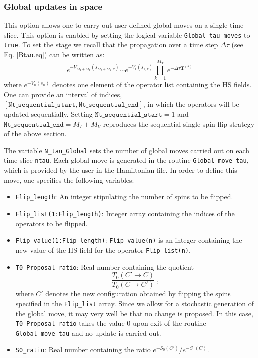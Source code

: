  
% 

\subsubsection{Global updates in space}
\label{sec:global_space}
This option allows one to carry out  user-defined global moves on a single time slice.  This option is enabled by setting the logical variable  \texttt{Global\_tau\_moves} to \texttt{true}.  To set the stage  we recall that the propagation over a time step $\Delta \tau$   (see Eq. \ref{Btau.eq}) can be  written as: 
\begin{equation}
	e^{-V_{M_I+M_V}(s_{M_I+M_V,\tau})}  \cdots e^{-V_{1}(s_{1,\tau})}  \prod_{k=1}^{M_T}   e^{-\Delta \tau {\bm T}^{(k)}}  
\end{equation}
where $e^{-V_{n}(s_{n})}$ denotes one element of the  operator list  containing the HS fields.  One can provide  an interval of indices, 
$ \left[ \texttt{Nt\_sequential\_start}, 
\texttt{Nt\_sequential\_end} \right] $,  in which the operators will be updated  sequentially. Setting $ \texttt{Nt\_sequential\_start} =1 $ and 
$ \texttt{Nt\_sequential\_end} = M_I+M_V$  reproduces the  sequential single spin flip strategy of the above section.

The variable \texttt{N\_tau\_Global}  sets the number of global moves carried out on each time slice \texttt{ntau}. Each global move is generated in the routine  \texttt{Global\_move\_tau}, which is provided by the user in the Hamiltonian file. In order to  define this move, one specifies the following variables: 
\begin{itemize}
\item \texttt{Flip\_length}:  An integer stipulating the  number of spins to be flipped.
\item \texttt{Flip\_list(1:Flip\_length)}:   Integer array containing the  indices of the operators to be flipped.
\item \texttt{Flip\_value(1:Flip\_length)}:  \texttt{Flip\_value(n)} is an  integer containing the new value of the  HS  field for the operator \texttt{Flip\_list(n)}.
\item  \texttt{T0\_Proposal\_ratio}:   Real number containing  the quotient
\begin{equation}
	 \frac{T_0(C' \rightarrow C)}{T_0(C \rightarrow C') }  \;,
\end{equation}
where $ C'$  denotes the new configuration  obtained by flipping the spins specified in the \texttt{Flip\_list}  array. 
Since we allow for a stochastic  generation of  the global move, it may very well be that no change is proposed. In this case, \texttt{T0\_Proposal\_ratio}   takes the value 0 upon exit of the routine \texttt{Global\_move\_tau} and  no update is carried out. 
\item \texttt{S0\_ratio}:   Real number containing  the ratio  $e^{-S_0(C')}/e^{-S_0(C)}$. 
\end{itemize}
